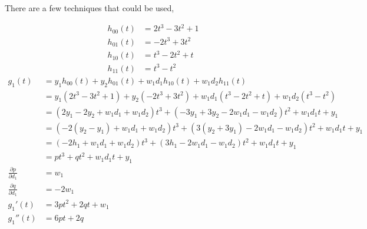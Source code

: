 \documentclass{article}
\begin{document}
There are a few techniques that could be used,

\newcommand{\dx}{\, \mathrm{d}x}
\newcommand{\dt}{\, \mathrm{d}t}
\newcommand{\ddx}[1]{\frac{\mathrm{d}#1}{\mathrm{d}x}}

\newpage
\begin{align*}
  h_{00}(t)
  &= 2t^3-3t^2+1 \\
  h_{01}(t)
  &= -2t^3+3t^2 \\
  h_{10}(t)
  &= t^3-2t^2+t \\
  h_{11}(t)
  &= t^3-t^2
\end{align*}
\begin{align*}
  g_1(t)
  &= y_1h_{00}(t)+y_2h_{01}(t)+w_1d_1h_{10}(t)+w_1d_2h_{11}(t) \\
  &= y_1(2t^3-3t^2+1)+y_2(-2t^3+3t^2)+w_1d_1(t^3-2t^2+t)+w_1d_2(t^3-t^2) \\
  &= (2y_1-2y_2+w_1d_1+w_1d_2)t^3+(-3y_1+3y_2-2w_1d_1-w_1d_2)t^2+w_1d_1t+y_1 \\
  &= (-2(y_2-y_1)+w_1d_1+w_1d_2)t^3+(3(y_2+3y_1)-2w_1d_1-w_1d_2)t^2+w_1d_1t+y_1 \\
  &= (-2h_1+w_1d_1+w_1d_2)t^3+(3h_1-2w_1d_1-w_1d_2)t^2+w_1d_1t+y_1 \\
  &= pt^3+qt^2+w_1d_1t+y_1 \\
  \frac{\partial p}{\partial d_1}
  &= w_1 \\
  \frac{\partial q}{\partial d_1}
  &= -2w_1 \\
  g_1'(t)
  &= 3pt^2+2qt+w_1 \\
  g_1''(t)
  &= 6pt+2q
\end{align*}
\end{document}
